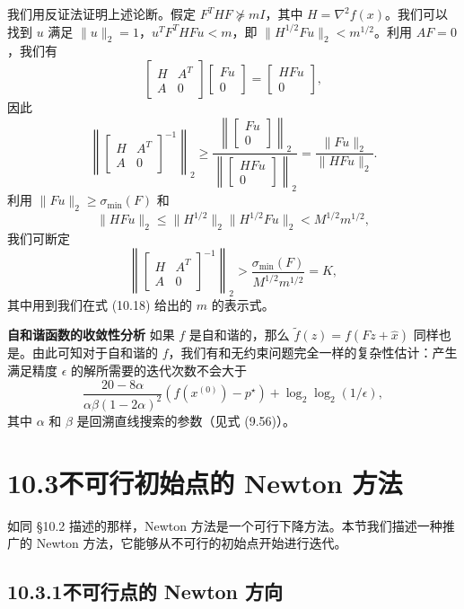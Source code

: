 \documentclass[UTF8, 12pt, fontset=fandol, oneside]{ctexart}
\begin{document}
我们用反证法证明上述论断。假定 $F^THF\nsucceq mI$，其中 $H=\nabla^2 f(x)$。我们可以找到 $u$ 满足 $\|u\|_2=1$，$u^TF^THFu<m$，即 $\|H^{1/2}Fu\|_2<m^{1/2}$。利用 $AF=0$，我们有
\[
\begin{bmatrix}
H & A^T\\
A & 0
\end{bmatrix}
\begin{bmatrix}
Fu\\
0
\end{bmatrix}
=
\begin{bmatrix}
HFu\\
0
\end{bmatrix},
\]
因此
\[
\left\|
\begin{bmatrix}
H & A^T\\
A & 0
\end{bmatrix}^{-1}
\right\|_2
\geq
\frac{\left\|\begin{bmatrix}Fu\\0\end{bmatrix}\right\|_2}
{\left\|\begin{bmatrix}HFu\\0\end{bmatrix}\right\|_2}
=\frac{\|Fu\|_2}{\|HFu\|_2}.
\]
利用 $\|Fu\|_2\geq\sigma_{\min}(F)$ 和
\[
\|HFu\|_2\leq \|H^{1/2}\|_2\|H^{1/2}Fu\|_2<M^{1/2}m^{1/2},
\]
我们可断定
\[
\left\|
\begin{bmatrix}
H & A^T\\
A & 0
\end{bmatrix}^{-1}
\right\|_2
>\frac{\sigma_{\min}(F)}{M^{1/2}m^{1/2}}=K,
\]
其中用到我们在式 (10.18) 给出的 $m$ 的表示式。

\noindent\textbf{自和谐函数的收敛性分析}\quad
如果 $f$ 是自和谐的，那么 $\tilde{f}(z)=f(Fz+\hat{x})$ 同样也是。由此可知对于自和谐的 $f$，我们有和无约束问题完全一样的复杂性估计：产生满足精度 $\epsilon$ 的解所需要的迭代次数不会大于
\[
\frac{20-8\alpha}{\alpha\beta(1-2\alpha)^2}(f(x^{(0)})-p^\star)+\log_2\log_2(1/\epsilon),
\]
其中 $\alpha$ 和 $\beta$ 是回溯直线搜索的参数（见式 (9.56)）。

\section*{10.3\quad 不可行初始点的 Newton 方法}

如同 \S10.2 描述的那样，Newton 方法是一个可行下降方法。本节我们描述一种推广的 Newton 方法，它能够从不可行的初始点开始进行迭代。

\subsection*{10.3.1\quad 不可行点的 Newton 方向}
\end{document}
